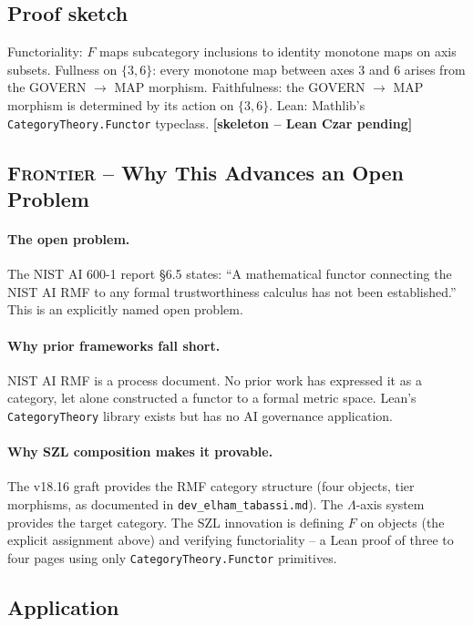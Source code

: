 \subsection*{Proof sketch}

Functoriality: $F$ maps subcategory inclusions to identity monotone
maps on axis subsets.  Fullness on $\{3,6\}$: every monotone map
between axes 3 and 6 arises from the GOVERN $\to$ MAP morphism.
Faithfulness: the GOVERN $\to$ MAP morphism is determined by its
action on $\{3,6\}$.  Lean: Mathlib's
\texttt{CategoryTheory.Functor} typeclass.
\hfill \textbf{[skeleton -- Lean Czar pending]}

\subsection*{\textsc{Frontier} -- Why This Advances an Open Problem}

\paragraph{The open problem.}
The NIST AI 600-1 report \S{}6.5 states: ``A mathematical functor
connecting the NIST AI RMF to any formal trustworthiness calculus
has not been established.''  This is an explicitly named open problem.

\paragraph{Why prior frameworks fall short.}
NIST AI RMF is a process document.  No prior work has expressed it
as a category, let alone constructed a functor to a formal metric
space.  Lean's \texttt{CategoryTheory} library exists but has no
AI governance application.

\paragraph{Why SZL composition makes it provable.}
The v18.16 graft provides the RMF category structure (four objects,
tier morphisms, as documented in \texttt{dev\_elham\_tabassi.md}).
The \(\Lambda\)-axis system provides the target category.
The SZL innovation is defining $F$ on objects (the explicit assignment
above) and verifying functoriality -- a Lean proof of three to four
pages using only \texttt{CategoryTheory.Functor} primitives.

\subsection*{Application}

